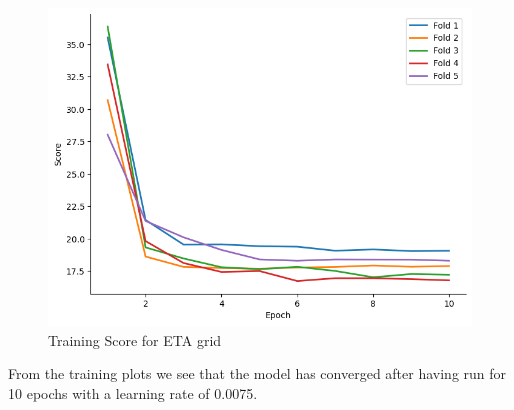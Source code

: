 \documentclass{report} %
\begin{document}
\begin{figure}[H]
\begin{minipage}[b]{0.3\textwidth}
        \includegraphics[width=\textwidth]{./ReportImages/train_score_y2.png}
        \caption{Training Score for ETA grid}
        \label{fig:Training Score for ETA grid}
    \end{minipage}
\end{figure}

From the training plots we see that the model has converged after having run for 10 epochs with a learning rate of 0.0075.
\end{document}
